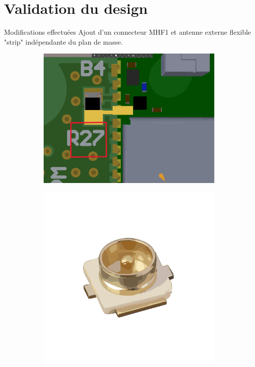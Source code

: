 \documentclass{beamer}
\begin{document}
\section{Validation du design}

\begin{frame}{Modifications effectuées}
	Ajout d'un connecteur MHF1 et antenne externe flexible "strip" indépendante du plan de masse.
	
	\begin{figure}
		\centering
		\begin{subfigure}[b]{0.3\textwidth}
			\centering
			\includegraphics[width=1\linewidth, center]{../figures/presentation/modif}
		\end{subfigure}
		\hfill
		\begin{subfigure}[b]{0.3\textwidth}
			\centering
			\includegraphics[width=1\linewidth, center]{../figures/presentation/MFG_CONMHF1-SMD-G-T}

\end{subfigure}
\end{figure}
\end{frame}
\end{document}
